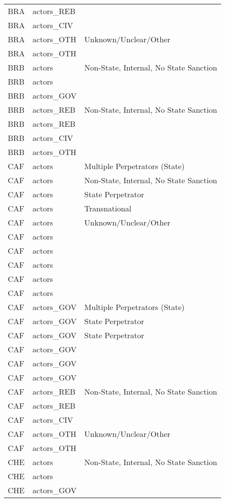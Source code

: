 \begin{table}[ht]
\begin{tabular}{lll}
  BRA & actors\_REB &  \\ 
  BRA & actors\_CIV &  \\ 
  BRA & actors\_OTH & Unknown/Unclear/Other \\ 
  BRA & actors\_OTH &  \\ 
  BRB & actors & Non-State, Internal, No State Sanction \\ 
  BRB & actors &  \\ 
  BRB & actors\_GOV &  \\ 
  BRB & actors\_REB & Non-State, Internal, No State Sanction \\ 
  BRB & actors\_REB &  \\ 
  BRB & actors\_CIV &  \\ 
  BRB & actors\_OTH &  \\ 
  CAF & actors & Multiple Perpetrators (State) \\ 
  CAF & actors & Non-State, Internal, No State Sanction \\ 
  CAF & actors & State Perpetrator \\ 
  CAF & actors & Transnational \\ 
  CAF & actors & Unknown/Unclear/Other \\ 
  CAF & actors &  \\ 
  CAF & actors &  \\ 
  CAF & actors &  \\ 
  CAF & actors &  \\ 
  CAF & actors &  \\ 
  CAF & actors\_GOV & Multiple Perpetrators (State) \\ 
  CAF & actors\_GOV & State Perpetrator \\ 
  CAF & actors\_GOV & State Perpetrator \\ 
  CAF & actors\_GOV &  \\ 
  CAF & actors\_GOV &  \\ 
  CAF & actors\_GOV &  \\ 
  CAF & actors\_REB & Non-State, Internal, No State Sanction \\ 
  CAF & actors\_REB &  \\ 
  CAF & actors\_CIV &  \\ 
  CAF & actors\_OTH & Unknown/Unclear/Other \\ 
  CAF & actors\_OTH &  \\ 
  CHE & actors & Non-State, Internal, No State Sanction \\ 
  CHE & actors &  \\ 
  CHE & actors\_GOV &  \\ 

\end{tabular}
\end{table}
